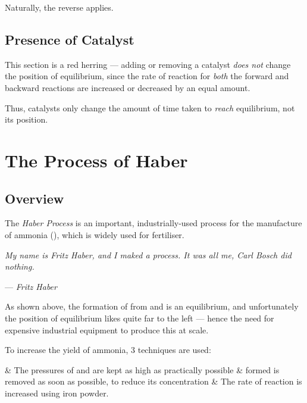 			Naturally, the reverse applies.



		\subsection{Presence of Catalyst}

			This section is a red herring --- adding or removing a catalyst \textit{does not} change the position of equilibrium, since the
			rate of reaction for \textit{both} the forward and backward reactions are increased or decreased by an equal amount.

			Thus, catalysts only change the amount of time taken to \textit{reach} equilibrium, not its position.




	\pagebreak
	\section{The Process of Haber}

		\subsection{Overview}

			The \textit{Haber Process} is an important, industrially-used process for the manufacture of ammonia (), which is widely
			used for fertiliser.

			\textit{My name is Fritz Haber, and I maked a process. It was all me, Carl Bosch did nothing.}

			--- \textit{Fritz Haber}

			As shown above, the formation of  from  and  is an equilibrium, and unfortunately the position of equilibrium
			likes quite far to the left --- hence the need for expensive industrial equipment to produce this at scale.




			To increase the yield of ammonia, 3 techniques are used:


			\begin{bulletlist}
				& The pressures of  and  are kept as high as practically possible
				&  formed is removed as soon as possible, to reduce its concentration
				& The rate of reaction is increased using iron powder.
			\end{bulletlist}

